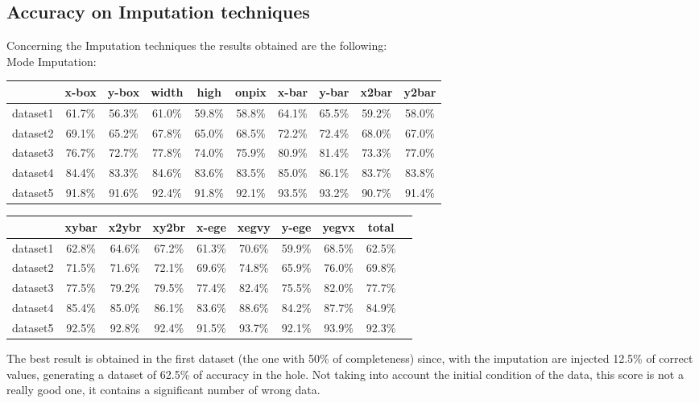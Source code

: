 \documentclass{article}
\begin{document}
\subsection*{Accuracy on Imputation techniques}
Concerning the Imputation techniques the results obtained are the following:\\
Mode Imputation:
\begin{center}
    \begin{table}[h]
\begin{tabular}{|c|c|c|c|c|c|c|c|c|c|}
\hline
 & x-box & y-box & width & high & onpix & x-bar & y-bar & x2bar & y2bar \\ \hline
dataset1 & 61.7\% & 56.3\% & 61.0\% & 59.8\% & 58.8\% & 64.1\% & 65.5\% & 59.2\% & 58.0\% \\ \hline
dataset2 & 69.1\% & 65.2\% & 67.8\% & 65.0\% & 68.5\% & 72.2\% & 72.4\% & 68.0\% & 67.0\% \\ \hline
dataset3 & 76.7\% & 72.7\% & 77.8\% & 74.0\% & 75.9\% & 80.9\% & 81.4\% & 73.3\% & 77.0\% \\ \hline
dataset4 & 84.4\% & 83.3\% & 84.6\% & 83.6\% & 83.5\% & 85.0\% & 86.1\% & 83.7\% & 83.8\% \\ \hline
dataset5 & 91.8\% & 91.6\% & 92.4\% & 91.8\% & 92.1\% & 93.5\% & 93.2\% & 90.7\% & 91.4\% \\ \hline
\end{tabular}
\end{table}
\begin{table}[h]
\begin{tabular}{|c|c|c|c|c|c|c|c|c|c|}
\hline
 & xybar & x2ybr & xy2br & x-ege & xegvy & y-ege & yegvx & total \\ \hline
dataset1 & 62.8\% & 64.6\% & 67.2\% & 61.3\% & 70.6\% & 59.9\% & 68.5\% & 62.5\% \\ \hline
dataset2 & 71.5\% & 71.6\% & 72.1\% & 69.6\% & 74.8\% & 65.9\% & 76.0\% & 69.8\% \\ \hline
dataset3 & 77.5\% & 79.2\% & 79.5\% & 77.4\% & 82.4\% & 75.5\% & 82.0\% & 77.7\% \\ \hline
dataset4 & 85.4\% & 85.0\% & 86.1\% & 83.6\% & 88.6\% & 84.2\% & 87.7\% & 84.9\% \\ \hline
dataset5 & 92.5\% & 92.8\% & 92.4\% & 91.5\% & 93.7\% & 92.1\% & 93.9\% & 92.3\% \\ \hline
\end{tabular}
\end{table}
\end{center}
The best result is obtained in the first dataset (the one with 50\% of completeness) since, with the imputation are injected 12.5\% of correct values, generating a dataset of 62.5\% of accuracy in the hole. Not taking into account the initial condition of the data, this score is not a really good one, it contains a significant number of wrong data.\\\\
\end{document}
